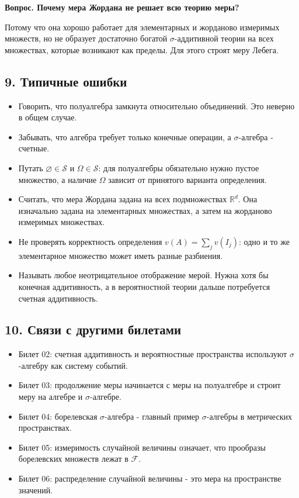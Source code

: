 \documentclass[
  11pt,
  a4paper,
]{article}
\providecommand{\tightlist}{%
  \setlength{\itemsep}{0pt}\setlength{\parskip}{0pt}}
\begin{document}
\textbf{Вопрос. Почему мера Жордана не решает всю теорию меры?}

Потому что она хорошо работает для элементарных и жорданово измеримых
множеств, но не образует достаточно богатой \(\sigma\)-аддитивной теории
на всех множествах, которые возникают как пределы. Для этого строят меру
Лебега.

\subsection{9. Типичные
ошибки}\label{ux442ux438ux43fux438ux447ux43dux44bux435-ux43eux448ux438ux431ux43aux438}

\begin{itemize}
\tightlist
\item
  Говорить, что полуалгебра замкнута относительно объединений. Это
  неверно в общем случае.
\item
  Забывать, что алгебра требует только конечные операции, а
  \(\sigma\)-алгебра - счетные.
\item
  Путать \(\varnothing\in\mathcal S\) и \(\Omega\in\mathcal S\): для
  полуалгебры обязательно нужно пустое множество, а наличие \(\Omega\)
  зависит от принятого варианта определения.
\item
  Считать, что мера Жордана задана на всех подмножествах
  \(\mathbb R^d\). Она изначально задана на элементарных множествах, а
  затем на жорданово измеримых множествах.
\item
  Не проверять корректность определения \(v(A)=\sum_jv(I_j)\): одно и то
  же элементарное множество может иметь разные разбиения.
\item
  Называть любое неотрицательное отображение мерой. Нужна хотя бы
  конечная аддитивность, а в вероятностной теории дальше потребуется
  счетная аддитивность.
\end{itemize}

\subsection{10. Связи с другими
билетами}\label{ux441ux432ux44fux437ux438-ux441-ux434ux440ux443ux433ux438ux43cux438-ux431ux438ux43bux435ux442ux430ux43cux438}

\begin{itemize}
\tightlist
\item
  Билет 02: счетная аддитивность и вероятностные пространства используют
  \(\sigma\)-алгебру как систему событий.
\item
  Билет 03: продолжение меры начинается с меры на полуалгебре и строит
  меру на алгебре и \(\sigma\)-алгебре.
\item
  Билет 04: борелевская \(\sigma\)-алгебра - главный пример
  \(\sigma\)-алгебры в метрических пространствах.
\item
  Билет 05: измеримость случайной величины означает, что прообразы
  борелевских множеств лежат в \(\mathcal F\).
\item
  Билет 06: распределение случайной величины - это мера на пространстве
  значений.
\end{itemize}
\end{document}
